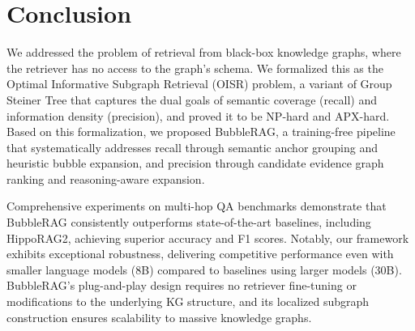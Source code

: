 \section{Conclusion}

We addressed the problem of retrieval from black-box knowledge graphs, where the retriever has no access to the graph's schema. We formalized this as the Optimal Informative Subgraph Retrieval (OISR) problem, a variant of Group Steiner Tree that captures the dual goals of semantic coverage (recall) and information density (precision), and proved it to be NP-hard and APX-hard. Based on this formalization, we proposed BubbleRAG, a training-free pipeline that systematically addresses recall through semantic anchor grouping and heuristic bubble expansion, and precision through candidate evidence graph ranking and reasoning-aware expansion.

Comprehensive experiments on multi-hop QA benchmarks demonstrate that BubbleRAG consistently outperforms state-of-the-art baselines, including HippoRAG2, achieving superior accuracy and F1 scores. Notably, our framework exhibits exceptional robustness, delivering competitive performance even with smaller language models (8B) compared to baselines using larger models (30B). BubbleRAG's plug-and-play design requires no retriever fine-tuning or modifications to the underlying KG structure, and its localized subgraph construction ensures scalability to massive knowledge graphs.





